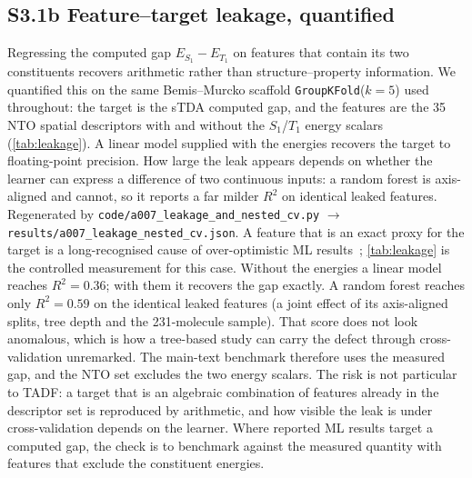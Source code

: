 \documentclass[final,3p,times,twocolumn]{elsarticle}
\makeatletter
\newcommand{\silabel}[2]{\phantomsection\protected@edef\@currentlabel{#1}\label{#2}}
\makeatother
\begin{document}
\subsection*{S3.1b Feature--target leakage, quantified}\silabel{S3.1b}{sec:leakage}
Regressing the computed gap $E_{S_1}-E_{T_1}$ on features that contain its two
constituents recovers arithmetic rather than structure--property information. We
quantified this on the same Bemis--Murcko scaffold \texttt{GroupKFold}($k=5$) used
throughout: the target is the sTDA computed gap, and the features are the \num{35} NTO
spatial descriptors with and without the $S_1$/$T_1$ energy scalars
(\cref{tab:leakage}). A linear model supplied with the energies recovers the target to
floating-point precision. How large the leak appears depends on whether the learner can
express a difference of two continuous inputs: a random forest is axis-aligned and
cannot, so it reports a far milder $R^2$ on identical leaked features. Regenerated by
\texttt{code/a007\_leakage\_and\_nested\_cv.py} $\rightarrow$
\texttt{results/a007\_leakage\_nested\_cv.json}.
A feature that is an exact proxy for the target is a long-recognised cause of
over-optimistic ML results~\cite{Kaufman2012,Kapoor2023,Artrith2021};
\cref{tab:leakage} is the controlled measurement for this case. Without the energies a
linear model reaches $R^2 = 0.36$; with them it recovers the gap exactly. A random forest
reaches only $R^2 = 0.59$ on the identical leaked features (a joint effect of its
axis-aligned splits, tree depth and the \num{231}-molecule sample). That score does not
look anomalous, which is how a tree-based study can carry the defect through
cross-validation unremarked. The main-text benchmark therefore uses the measured gap,
and the NTO set excludes the two energy scalars. The risk is not particular to TADF: a
target that is an algebraic combination of features already in the descriptor set is
reproduced by arithmetic, and how visible the leak is under cross-validation depends on
the learner. Where reported ML results target a computed gap, the check is to benchmark
against the measured quantity with features that exclude the constituent energies.
\end{document}
